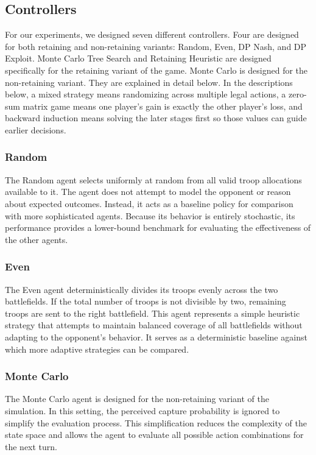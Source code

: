 \documentclass[letterpaper, 10 pt, conference]{ieeeconf}  %
\begin{document}
\subsection{Controllers}
For our experiments, we designed seven different controllers. Four are designed for both retaining and non-retaining variants: Random, Even, DP Nash, and DP Exploit. Monte Carlo Tree Search and Retaining Heuristic are designed specifically for the retaining variant of the game. Monte Carlo is designed for the non-retaining variant. They are explained in detail below. In the descriptions below, a mixed strategy means randomizing across multiple legal actions, a zero-sum matrix game means one player's gain is exactly the other player's loss, and backward induction means solving the later stages first so those values can guide earlier decisions.
\subsubsection{Random}
The Random agent selects uniformly at random from all valid troop allocations available to it. The agent does not attempt to model the opponent or reason about expected outcomes. Instead, it acts as a baseline policy for comparison with more sophisticated agents. Because its behavior is entirely stochastic, its performance provides a lower-bound benchmark for evaluating the effectiveness of the other agents.
\subsubsection{Even}
The Even agent deterministically divides its troops evenly across the two battlefields. If the total number of troops is not divisible by two, remaining troops are sent to the right battlefield. This agent represents a simple heuristic strategy that attempts to maintain balanced coverage of all battlefields without adapting to the opponent's behavior. It serves as a deterministic baseline against which more adaptive strategies can be compared.
\subsubsection{Monte Carlo}
The Monte Carlo agent is designed for the non-retaining variant of the simulation. In this setting, the perceived capture probability is ignored to simplify the evaluation process. This simplification reduces the complexity of the state space and allows the agent to evaluate all possible action combinations for the next turn.
\end{document}

